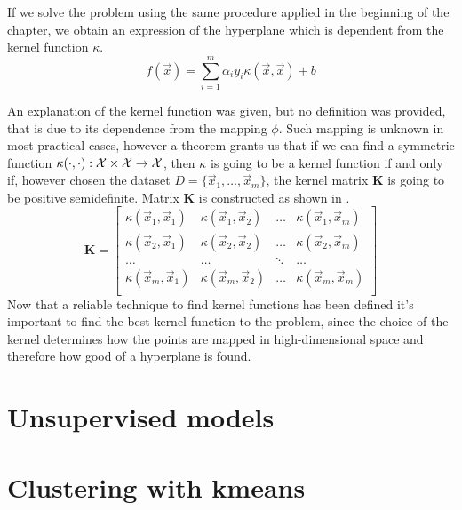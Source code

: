 If we solve the problem using the same procedure applied in the beginning of the chapter, we obtain
an expression of the hyperplane which is dependent from the kernel function $\kappa$.
\begin{equation}
	\label{eq:hd-of}
	f(\vec{x}) = \sum_{i = 1}^m\alpha_iy_i\kappa(\vec{x}, \vec{x}) + b
\end{equation}

An explanation of the kernel function was given, but no definition was provided, that is due to its
dependence from the mapping $\phi$. Such mapping is unknown in most practical cases, however a
theorem \cite{learning-with-kernels} grants us that if we can find a symmetric function $\kappa(\cdot, \cdot): \mathcal{X} \times \mathcal{X} \rightarrow
\mathcal{X}$, then $\kappa$ is going to be a kernel function if and only if, however chosen the dataset $D
= \{\vec{x}_1, \ldots, \vec{x}_m\}$, the kernel matrix $\mathbf{K}$ is going to be positive
semidefinite. Matrix $\mathbf{K}$ is constructed as shown in .
\begin{equation}
	\label{eq:kernel-matrix}
	\mathbf{K} = 
	\begin{bmatrix}
		\kappa(\vec{x}_1, \vec{x}_1) & \kappa(\vec{x}_1, \vec{x}_2) & \ldots &
		\kappa(\vec{x}_1, \vec{x}_m) \\
		\kappa(\vec{x}_2, \vec{x}_1) & \kappa(\vec{x}_2, \vec{x}_2) & \ldots &
		\kappa(\vec{x}_2, \vec{x}_m) \\
		\ldots & \ldots & \ddots & \ldots \\
		\kappa(\vec{x}_m, \vec{x}_1) & \kappa(\vec{x}_m, \vec{x}_2) & \ldots &
		\kappa(\vec{x}_m, \vec{x}_m) \\
	\end{bmatrix}
\end{equation}
Now that a reliable technique to find kernel functions has been defined it's important to find the
best kernel function to the problem, since the choice of the kernel determines how the points are
mapped in high-dimensional space and therefore how good of a hyperplane is found.

\section{Unsupervised models}
\label{sec:uml}

\section{Clustering with k\-means}
\label{sec:kmeans}
